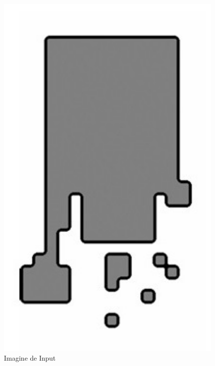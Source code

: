 \documentclass[a4paper,12pt]{report}
\begin{document}
\begin{figure}[h!]
    \centering
    \begin{minipage}{0.25\textwidth}
        \centering
        \includegraphics[width=1\textwidth]{images/input_dilate.jpg}
        \caption{Imagine de Input}
    \end{minipage}
    \hspace{0.05\textwidth}
    \begin{minipage}{0.25\textwidth}
        \centering

\end{minipage}
\end{figure}
\end{document}
